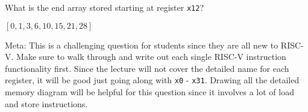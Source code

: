 \begin{blocksection}
\question
What is the end array stored starting at register \lstinline$x12$?

\begin{solution}
$[0, 1, 3, 6, 10, 15, 21, 28]$

Meta: This is a challenging question for students since they are all new to RISC-V. Make sure to walk through and write out each single RISC-V instruction functionality first. Since the lecture will not cover the detailed name for each register, it will be good just going along with \lstinline$x0$ - \lstinline$x31$. Drawing all the detailed memory diagram will be helpful for this question since it involves a lot of load and store instructions. 
\end{solution}
\end{blocksection}